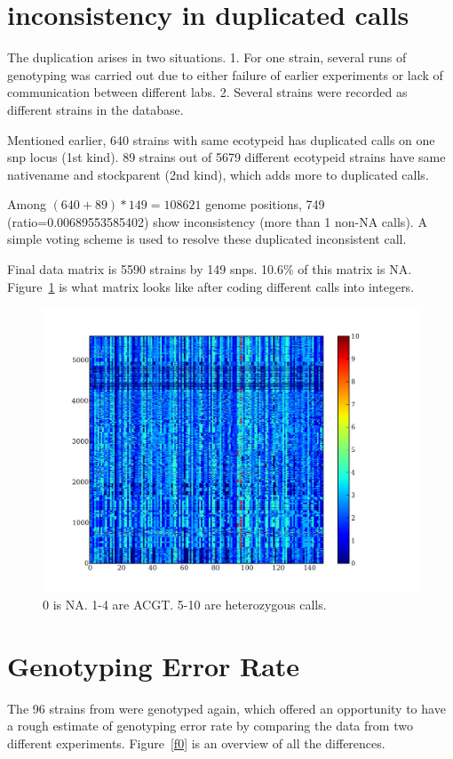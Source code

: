 \documentclass[a4paper,10pt]{article}
\begin{document}
\section{inconsistency in duplicated calls}
The duplication arises in two situations. 1. For one strain, several runs of genotyping was carried out due to either failure of earlier experiments or lack of communication between different labs. 2. Several strains were recorded as different strains in the database.

Mentioned earlier, 640 strains with same ecotypeid has duplicated calls on one snp locus (1st kind). 89 strains out of 5679 different ecotypeid strains have same nativename and stockparent (2nd kind), which adds more to duplicated calls.

Among $(640+89)*149=108621$ genome positions, 749 (ratio=0.00689553585402) show inconsistency (more than 1 non-NA calls). A simple voting scheme is used to resolve these duplicated inconsistent call.

Final data matrix is 5590 strains by 149 snps. 10.6\% of this matrix is NA. Figure~\ref{f24} is what matrix looks like after coding different calls into integers.

\begin{figure}
\includegraphics[width=1\textwidth]{figures/data.png}
\caption{0 is NA. 1-4 are ACGT. 5-10 are heterozygous calls.}\label{f24}
\end{figure}

\section{Genotyping Error Rate}
The 96 strains from \cite{Nordborg2005} were genotyped again, which offered an opportunity to have a rough estimate of genotyping error rate by comparing the data from two different experiments. Figure~\ref{f0} is an overview of all the differences.
\end{document}
